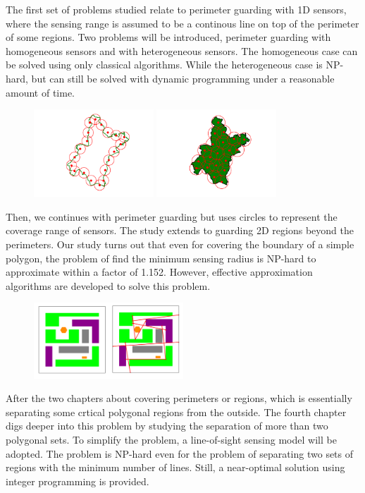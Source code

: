 The first set of problems studied relate to perimeter guarding with 1D sensors, where the sensing range 
is assumed to be a continous line on top of the perimeter of some regions. 
Two problems will be introduced, perimeter guarding with homogeneous sensors and with heterogeneous sensors. 
The homogeneous case can be solved using only classical algorithms. 
While the heterogeneous case is NP-hard, but can still be solved with dynamic programming under a reasonable
amount of time. 

\begin{figure}[ht]
    \centering
    \includegraphics[width = 0.4\textwidth]{chapters/osg/figures/wuhan_ilp.png}
    \includegraphics[width = 0.4\textwidth]{chapters/osg/figures/wuhan_region_ilp.png}
    \label{fig:intro-osg}
\end{figure}
Then, we continues with perimeter guarding but uses circles to represent the 
coverage range of sensors. The study extends to guarding 2D regions beyond the perimeters. 
Our study turns out that even for covering the boundary of a simple polygon, 
the problem of find the minimum sensing radius is NP-hard to approximate within a factor of 1.152. 
However, effective approximation algorithms are developed to solve this problem. 

\begin{figure}[ht]
    \centering
    \includegraphics[width = 0.5\textwidth]{chapters/bf/fig/intro_pic.png}
    \label{fig:intro-lines}
\end{figure}
After the two chapters about covering perimeters or regions, which is essentially separating 
some crtical polygonal regions from the outside. 
The fourth chapter digs deeper into this problem by studying the separation of more than two polygonal sets. 
To simplify the problem, a line-of-sight sensing model will be adopted. 
The problem is NP-hard even for the problem of separating two sets of regions with the minimum number of lines. 
Still, a near-optimal solution using integer programming is provided. 

